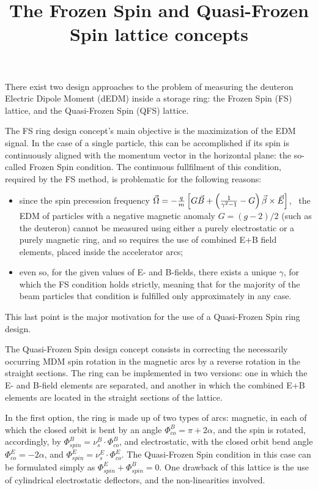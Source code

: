 \documentclass{article}
\newcommand{\W}{\Omega}
\newcommand{\st}{\nu_s}
\begin{document}
\title{The Frozen Spin and Quasi-Frozen Spin lattice concepts}
There exist two design approaches to the problem of measuring the deuteron Electric Dipole Moment (dEDM) inside a storage ring: the Frozen Spin (FS) lattice, and the Quasi-Frozen Spin (QFS) lattice.

The FS ring design concept's main objective is the maximization of the EDM signal. In the case of a single particle, this can be accomplished if its spin is continuously aligned with the momentum vector in the horizontal plane: the so-called Frozen Spin condition. The continuous fullfilment of this condition, required by the FS method, is problematic for the following reasons:
\begin{itemize}
\item since the spin precession frequency $\vec\W = -\frac{q}{m}\bkt*{G\vec B + \bkt{\frac{1}{\gamma^2-1}-G}\vec\beta\times\vec E}$,~\cite{JEDI:SpinTuneMapping} the EDM of particles with a negative magnetic anomaly $G = (g-2)/2$ (such as the deuteron) cannot be measured using either a purely electrostatic or a purely magnetic ring, and so requires the use of combined E+B field elements, placed inside the accelerator arcs;
\item even so, for the given values of E- and B-fields, there exists a unique $\gamma$, for which the FS condition holds strictly, meaning that for the majority of the beam particles that condition is fulfilled only approximately in any case.
\end{itemize}
This last point is the major motivation for the use of a Quasi-Frozen Spin ring design.

The Quasi-Frozen Spin design concept consists in correcting the necessarily occurring MDM spin rotation in the magnetic arcs by a reverse rotation in the straight sections. The ring can be implemented in two versions: one in which the E- and B-field elements are separated, and another in which the combined E+B elements are located in the straight sections of the lattice.~\cite{Senichev:Shanghai}

In the first option, the ring is made up of two types of arcs: magnetic, in each of which the closed orbit is bent by an angle $\Phi^B_{co} = \pi + 2\alpha$, and the spin is rotated, accordingly, by $\Phi^B_{spin} = \st^B\cdot \Phi^B_{co}$, and electrostatic, with the closed orbit bend angle $\Phi^E_{co} = -2\alpha$, and $\Phi^E_{spin} = \st^E\cdot \Phi^E_{co}$. The Quasi-Frozen Spin condition in this case can be formulated simply as $\Phi^E_{spin} + \Phi^B_{spin} = 0$. One drawback of this lattice is the use of cylindrical electrostatic deflectors, and the non-linearities involved.
\end{document}
